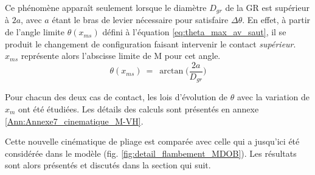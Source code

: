 Ce phénomène apparaît seulement lorsque le diamètre $D_{gr}$ de la GR est supérieur à $2a$, avec $a$ étant le bras de levier nécessaire pour satisfaire $\Delta\theta$. En effet, à partir de l'angle limite $\theta(x_{ms})$ défini à l'équation \ref{eq:theta_max_av_saut}, il se produit le changement de configuration faisant intervenir le contact \emph{supérieur}. $x_{ms}$ représente alors l'abscisse limite de M pour cet angle.
\begin{equation}
	\theta(x_{ms})\ = \ \arctan\biggl(\dfrac{2a}{D_{gr}}\biggr)
	\label{eq:theta_max_av_saut}
\end{equation} 

Pour chacun des deux cas de contact, les lois d'évolution de $\theta$ avec la variation de $x_m$ ont été étudiées. Les détails des calculs sont présentés en annexe \ref{Ann:Annexe7_cinematique_M-VH}. 

Cette nouvelle cinématique de pliage est comparée avec celle qui a jusqu'ici été considérée dans le modèle (fig. \ref{fig:detail_flambement_MDOB}). Les résultats sont alors présentés et discutés dans la section qui suit. 
